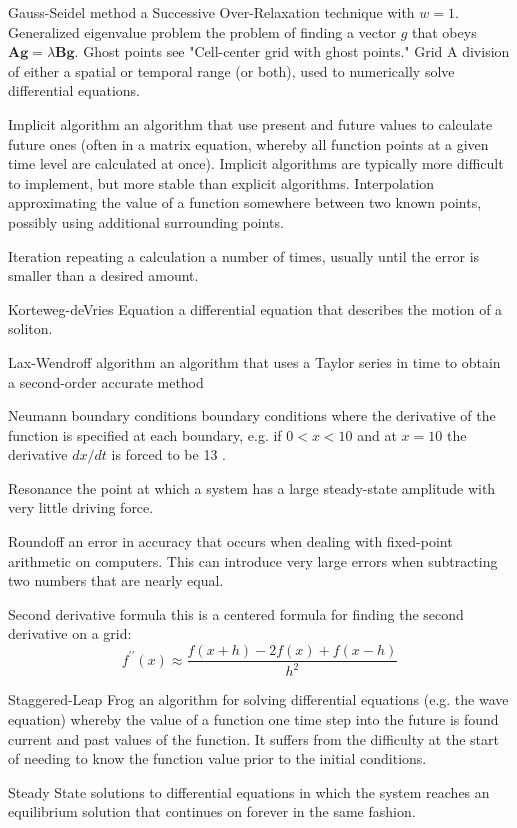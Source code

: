 \documentclass{book}
\theoremstyle{plain}
\theoremstyle{definition}
\numberwithin{exm}{chapter}
\theoremstyle{remark}
\theoremstyle{summary}
\theoremstyle{overview}
\begin{document}
Gauss-Seidel method a Successive Over-Relaxation technique with $w=1$.
Generalized eigenvalue problem the problem of finding a vector $g$ that obeys $\mathbf{A g}=\lambda \mathbf{B g} .$
Ghost points see "Cell-center grid with ghost points."
Grid A division of either a spatial or temporal range (or both), used to numerically solve differential equations.

Implicit algorithm an algorithm that use present and future values to calculate future ones (often in a matrix equation, whereby all function points at a given time level are calculated at once). Implicit algorithms are typically more difficult to implement, but more stable than explicit algorithms.
Interpolation approximating the value of a function somewhere between two known points, possibly using additional surrounding points.

Iteration repeating a calculation a number of times, usually until the error is smaller than a desired amount.

Korteweg-deVries Equation a differential equation that describes the motion of a soliton.

Lax-Wendroff algorithm an algorithm that uses a Taylor series in time to obtain a second-order accurate method

Neumann boundary conditions boundary conditions where the derivative of the function is specified at each boundary, e.g. if $0<x<10$ and at $x=10$ the derivative $d x / d t$ is forced to be 13 .

Resonance the point at which a system has a large steady-state amplitude with very little driving force.

Roundoff an error in accuracy that occurs when dealing with fixed-point arithmetic on computers. This can introduce very large errors when subtracting two numbers that are nearly equal.

Second derivative formula this is a centered formula for finding the second derivative on a grid:
$$
f^{\prime \prime}(x) \approx \frac{f(x+h)-2 f(x)+f(x-h)}{h^{2}}
$$

Staggered-Leap Frog an algorithm for solving differential equations (e.g. the wave equation) whereby the value of a function one time step into the future is found current and past values of the function. It suffers from the difficulty at the start of needing to know the function value prior to the initial conditions.

Steady State solutions to differential equations in which the system reaches an equilibrium solution that continues on forever in the same fashion.
\end{document}
